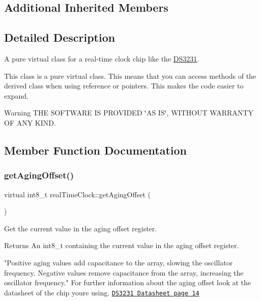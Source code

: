 \subsection*{Additional Inherited Members}


\subsection{Detailed Description}
A pure virtual class for a real-\/time clock chip like the \mbox{\hyperlink{class_d_s3231}{D\+S3231}}. 

This class is a pure virtual class. This means that you can access methods of the derived class when using reference or pointers. This makes the code easier to expand. \begin{DoxyWarning}{Warning}
T\+HE S\+O\+F\+T\+W\+A\+RE IS P\+R\+O\+V\+I\+D\+ED \char`\"{}\+A\+S I\+S\char`\"{}, W\+I\+T\+H\+O\+UT W\+A\+R\+R\+A\+N\+TY OF A\+NY K\+I\+ND. 
\end{DoxyWarning}


\subsection{Member Function Documentation}
\mbox{\label{classreal_time_clock_a2bc081385a6ad8273201d66217f8b2f0}} 
\subsubsection{\texorpdfstring{get\+Aging\+Offset()}{getAgingOffset()}}
{\footnotesize\ttfamily virtual int8\+\_\+t real\+Time\+Clock\+::get\+Aging\+Offset (\begin{DoxyParamCaption}{ }\end{DoxyParamCaption})\hspace{0.3cm}{\ttfamily [pure virtual]}}



Get the current value in the aging offset register. 

\begin{DoxyReturn}{Returns}
An int8\+\_\+t containing the current value in the aging offset register.
\end{DoxyReturn}
"Positive aging values add capacitance to the array, slowing the oscillator frequency. Negative values remove capacitance from the array, increasing the oscillator frequency." For further information about the aging offset look at the datasheet of the chip you\textquotesingle{}re using. \href{https://datasheets.maximintegrated.com/en/ds/DS3231.pdf}{\tt D\+S3231 Datasheet page 14} 

